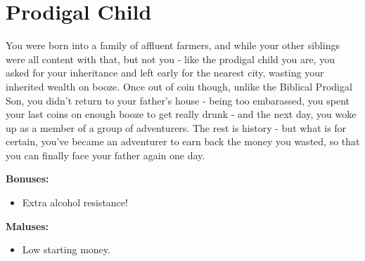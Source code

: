 \section{Prodigal Child}
You were born into a family of affluent farmers, and while your other siblings were all content with that, but not you - like the prodigal child you are, you asked for your inheritance and left early for the nearest city, wasting your inherited wealth on booze. Once out of coin though, unlike the Biblical Prodigal Son, you didn't return to your father's house - being too embarassed, you spent your last coins on enough booze to get really drunk - and the next day, you woke up as a member of a group of adventurers. The rest is history - but what is for certain, you've became an adventurer to earn back the money you wasted, so that you can finally face your father again one day.


\textbf{Bonuses:}
\begin{itemize}
	\item Extra alcohol resistance!
\end{itemize}


\textbf{Maluses:}
\begin{itemize}
	\item Low starting money.
\end{itemize}

